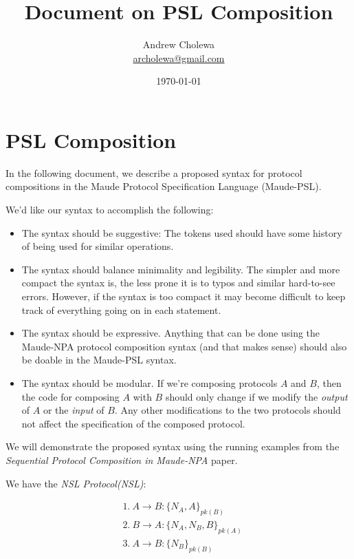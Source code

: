\documentclass{article}
\title{Document on PSL Composition}
\author{Andrew Cholewa \\
        \href{mailto:archolewa@gmail.com}{archolewa@gmail.com}}
\date{\today}
\begin{document}
\maketitle
\section{PSL Composition}

In the following document, we describe a proposed syntax for protocol
compositions in the Maude Protocol Specification Language (Maude-PSL).

We'd like our syntax to accomplish the following:

\begin{itemize}
    \item The syntax should be suggestive: The tokens used should have some
        history of being used for similar operations.
    \item The syntax should balance minimality and legibility. The 
        simpler and more compact the syntax is, the less prone it is to typos 
        and similar hard-to-see errors. However, if the syntax is too compact
        it may become difficult to keep track of everything going on in 
        each statement.
    \item The syntax should be expressive. Anything that can be done using
        the Maude-NPA protocol composition syntax (and that makes sense) should
        also be doable in the Maude-PSL syntax.
    \item The syntax should be modular. If we're composing protocols $A$ and
        $B$, then the code for composing $A$ with $B$ should only change if
        we modify the \emph{output} of $A$ or the \emph{input} of $B$. 
        Any other modifications to the two protocols should not affect 
        the specification of the composed protocol.
\end{itemize}

We will demonstrate the proposed syntax using the running examples from the
\textit{Sequential Protocol Composition in Maude-NPA} paper. 

We have the \textit{NSL Protocol(NSL)}:

\begin{align*}
    &1.~A \rightarrow B : \{N_A, A\}_{pk(B)}\\
    &2.~B \rightarrow A : \{N_A, N_B, B\}_{pk(A)}\\
    &3.~A \rightarrow B : \{N_B\}_{pk(B)}
\end{align*}
\end{document}
